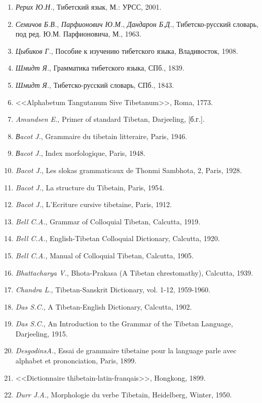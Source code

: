 \begin{enumerate}
	\item \emph{Рерих Ю.Н.}, Тибетский язык, М.: УРСС, 2001.
	\item \emph{Семичов Б.В.}, \emph{Парфионович Ю.М.}, \emph{Дандарон Б.Д.}, Тибетско-русский словарь, под ред. Ю.М. Парфионовича, М., 1963.
	\item \emph{Цыбиков Г.}, Пособие к изучению тибетского языка, Владивосток, 1908.
	\item \emph{Шмидт Я.}, Грамматика тибетского языка, СПб., 1839.
	\item \emph{Шмидт Я.}, Тибетско-русский словарь, СПб., 1843.
	\item <<Alphabetum Tangutanum Sive Tibetanum>>, Roma, 1773.
	\item \emph{Amundsen E.}, Primer of standard Tibetan, Darjeeling, [б.г.].
	\item \emph{Вacot J.}, Grammaire du tibetain litteraire, Paris, 1946.
	\item \emph{Вacot J.}, Index morfologique, Paris, 1948.
	\item \emph{Bacot J.}, Les slokas grammaticaux de Thonmi Sambhota, 2, Paris, 1928.
	\item \emph{Bacot J.}, La structure du Tibetain, Paris, 1954.
	\item \emph{Bacot J.}, L'Ecriture cursive tibetaine, Paris, 1912.
	\item \emph{Bell C.A.}, Grammar of Colloquial Tibetan, Calcutta, 1919.
	\item \emph{Bell C.A.}, English-Tibetan Colloquial Dictionary, Calcutta, 1920.
	\item \emph{Bell C.A.}, Manual of Colloquial Tibetan, Calcutta, 1905.
	\item \emph{Bhattacharya V.}, Bhota-Prakasa (A Tibetan chrestomathy), Calcutta, 1939.
	\item \emph{Chandra L.}, Tibetan-Sanskrit Dictionary, vol. 1-12, 1959-1960.
	\item \emph{Das S.C.}, A Tibetan-English Dictionary, Calcutta, 1902.
	\item \emph{Das S.C.}, An Introduction to the Grammar of the Tibetan Language, Darjeeling, 1915.
	\item \emph{DesgodinsA.}, Essai de grammaire tibetaine pour la language parle avec alphabet et prononciation, Paris, 1899.
	\item <<Dictionnaire thibetain-latin-franqais>>, Hongkong, 1899.
	\item \emph{Durr J.A.}, Morphologie du verbe Tibetain, Heidelberg, Winter, 1950.

\end{enumerate}
